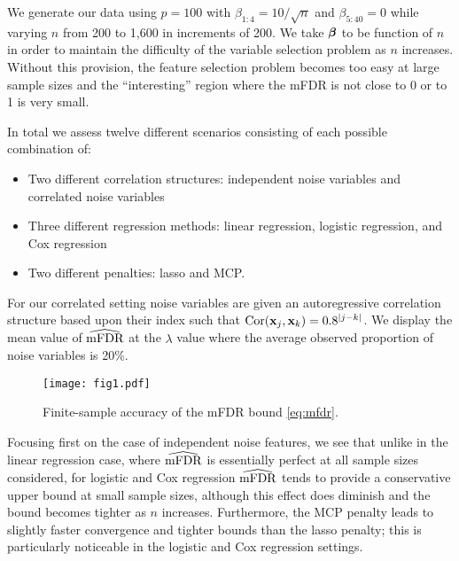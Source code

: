 We generate our data using $p = 100$ with $\beta_{1:4} = 10/\sqrt{n}$ and $\beta_{5:40} = 0$ while varying $n$ from 200 to 1,600 in increments of 200. We take $\boldsymbol{\beta}$ to be function of $n$ in order to maintain the difficulty of the variable selection problem as $n$ increases.
Without this provision, the feature selection problem becomes too easy at large sample sizes and the ``interesting'' region where the mFDR is not close to 0 or to 1 is very small.

In total we assess twelve different scenarios consisting of each possible combination of:
\begin{itemize}[leftmargin=*, labelindent=0.5cm]
\item Two different correlation structures: independent noise variables and correlated noise variables
\item Three different regression methods: linear regression, logistic regression, and Cox regression
\item Two different penalties: lasso and MCP. 
\end{itemize}
For our correlated setting noise variables are given an autoregressive correlation structure based upon their index such that $\textrm{Cor}(\mathbf{x}_j,\mathbf{x}_k) = 0.8^{|j - k|}$. We display the mean value of $\widehat{\textrm{mFDR}}$ at the $\lambda$ value where the average observed proportion of noise variables is 20\%.

\begin{figure} [!htb]
 \centering
  \texttt{[image: fig1.pdf]}
  \caption{\label{Fig:converge}Finite-sample accuracy of the mFDR bound \eqref{eq:mfdr}.}
\end{figure}

Focusing first on the case of independent noise features, we see that unlike in the linear regression case, where $\widehat{\textrm{mFDR}}$ is essentially perfect at all sample sizes considered, for logistic and Cox regression $\widehat{\textrm{mFDR}}$ tends to provide a conservative upper bound at small sample sizes, although this effect does diminish and the bound becomes tighter as $n$ increases.
Furthermore, the MCP penalty leads to slightly faster convergence and tighter bounds than the lasso penalty; this is particularly noticeable in the logistic and Cox regression settings.

